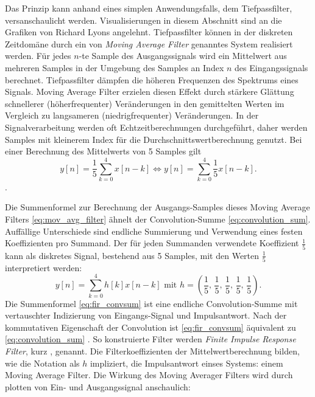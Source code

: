 Das Prinzip kann anhand eines simplen Anwendungsfalls, dem Tiefpassfilter, versanschaulicht werden.
Visualisierungen in diesem Abschnitt sind an die Grafiken von Richard Lyons \cite[Kapitel 5]{lyons2011} angelehnt.
Tiefpassfilter können in der diskreten Zeitdomäne durch ein von \cite[Kapitel 5, Seite 220]{lyons2011} \textit{Moving Average Filter} genanntes System realisiert werden.
Für jedes $n$-te Sample des Ausgangssignals wird ein Mittelwert aus mehreren Samples in der Umgebung des Samples an Index $n$ des Eingangssignals berechnet.
Tiefpassfilter dämpfen die höheren Frequenzen des Spektrums eines Signals. Moving Average Filter erzielen diesen Effekt
durch stärkere Glättung schnellerer (höherfrequenter) Veränderungen in den gemittelten Werten im Vergleich zu langsameren (niedrigfrequenter) Veränderungen.
In der Signalverarbeitung werden oft Echtzeitberechnungen durchgeführt, daher werden Samples mit kleinerem Index für die 
Durchschnittswertberechnung genutzt. Bei einer Berechnung des Mittelwerts von 5 Samples gilt
\begin{equation}
    y[n]=\frac{1}{5}\sum_{k=0}^4x[n-k]\iff y[n]=\sum_{k=0}^4\frac{1}{5}x[n-k].
    \label{eq:mov_avg_filter}
\end{equation}
\cite[Kapitel 5, Seite 172]{lyons2011}.

Die Summenformel zur Berechnung der Ausgangs-Samples dieses Moving Average Filters \ref{eq:mov_avg_filter} ähnelt der Convolution-Summe \ref{eq:convolution_sum}.
Auffällige Unterschiede sind endliche Summierung und Verwendung eines festen Koeffizienten pro Summand.
Der für jeden Summanden verwendete Koeffizient $\frac{1}{5}$ kann als diskretes Signal, bestehend aus 5 Samples, mit den Werten $\frac{1}{5}$ interpretiert werden:
\begin{equation}
    \label{eq:fir_convsum}
    y[n]=\sum_{k=0}^4h[k]x[n-k]\text{ mit }h=\left(\frac{1}{5},\,\frac{1}{5},\,\frac{1}{5},\,\frac{1}{5},\,\frac{1}{5}\right).
\end{equation}
Die Summenformel \ref{eq:fir_convsum} ist eine endliche Convolution-Summe mit vertauschter Indizierung von Eingangs-Signal und Impulsantwort. Nach der
kommutativen Eigenschaft der Convolution ist \ref{eq:fir_convsum} äquivalent zu \ref{eq:convolution_sum} \cite[Kapitel 2, Seite 29]{oppenheim1999}. So konstruierte Filter werden \textit{Finite Impulse Response Filter},
kurz , genannt. Die Filterkoeffizienten der Mittelwertberechnung bilden, wie die Notation als $h$ impliziert, die Impulsantwort einses Systems: einem
Moving Average Filter. Die Wirkung des Moving Averager Filters wird durch plotten von Ein- und Ausgangssignal anschaulich:

